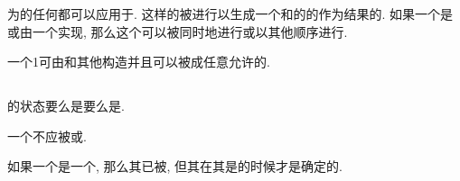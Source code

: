 为\Scalar{}\Object{}\Define{}的任何\Intrinsic{}\Operation{}都可以应用于\Conformable{}\Object{}. 这样的\Operation{}被\Elementally{}进行以生成一个和\Array{}的\Operand{}\Conformable{}的作为结果的\Array{}. 如果一个\Elemental{}\Operation{}是\Intrinsic{}\Prue{}\Operation{}或由一个\Prue{}\Elemental{}\Function{}实现, 那么这个\Elemental{}\Operation{}可以被同时地进行或以其他顺序进行.

一个1\Rank{}\Array{}可由\Scalar{}和其他\Array{}构造并且可以被\Reshape{}成任意允许的\Array{}\Shape{}.

\subsection{\Allocatable{}\Variable{}}

\Allocatable{}\Variable{}的\Allocation{}状态要么是\Allocated{}要么是\Unallocated{}.

一个\Unallocated{}\Variable{}不应被\Reference{}或\Define{}.

如果一个\Allocatable{}\Variable{}是一个\Array{}, 那么其\Rank{}已被\Declare{}, 但其\Bound{}在其是\Allocated{}的时候才是确定的.
